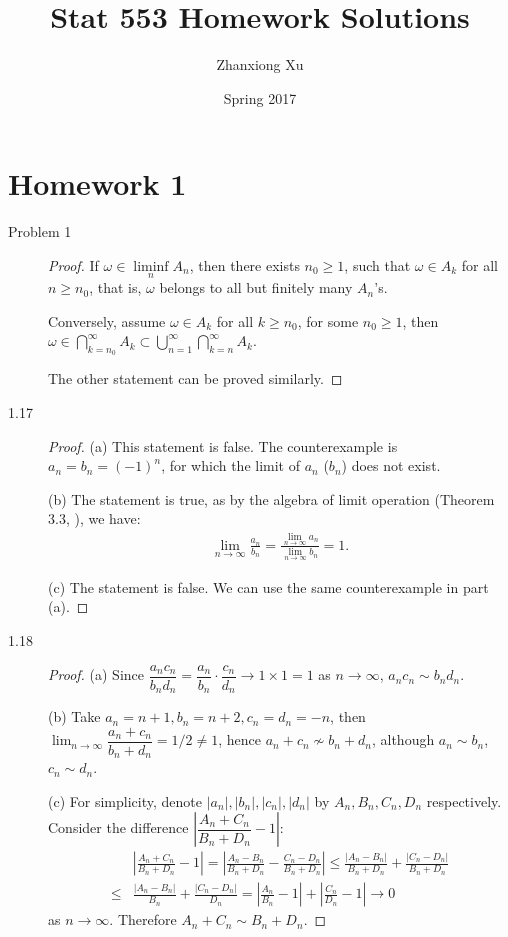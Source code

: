 \documentclass{article}
\title{Stat 553 Homework Solutions}
\author{Zhanxiong Xu}
\date{Spring 2017}
\theoremstyle{definition}
\theoremstyle{plain}
\theoremstyle{remark}
\begin{document}
\maketitle

\section*{Homework 1}
\begin{description}
\item[Problem 1]
\begin{proof} 
If $\omega \in \liminf\limits_n A_n$, then there exists $n_0 \geq 1$, such that
$\omega \in A_k$ for all $n \geq n_0$, that is, $\omega$ belongs to all but finitely many $A_n$'s.

Conversely, assume $\omega \in A_k$ for all $k \geq n_0$, for some $n_0 \geq 1$, then 
$\omega \in \bigcap_{k = n_0}^{\infty}A_k \subset \bigcup_{n = 1}^\infty 
\bigcap_{k = n}^\infty A_k$.

The other statement can be proved similarly.
\end{proof}

\item[1.17]
\begin{proof}
(a) This statement is false. The counterexample is $a_n = b_n = (-1)^n$, for which the 
limit of $a_n$ ($b_n$) does not exist.

(b) The statement is true, as by the algebra of limit operation (Theorem 3.3,
\cite{rudin1964}), we have:
\begin{align*}
    \lim_{n \to \infty} \frac{a_n}{b_n} = \frac{\lim\limits_{n \to \infty}a_n}
    {\lim\limits_{n \to \infty}b_n} = 1.
\end{align*}

(c) The statement is false. We can use the same counterexample in part (a).
\end{proof}

\item[1.18]
\begin{proof}
(a)
Since $\dfrac{a_n c_n}{b_n d_n} = \dfrac{a_n}{b_n} \cdot \dfrac{c_n}{d_n} \to 1 \times 1 
= 1$ as $n \to \infty$, $a_n c_n \sim b_n d_n$. 

(b) Take $a_n = n + 1, b_n = n + 2, c_n = d_n = -n$, then $\lim_{n \to \infty} \dfrac{a_n + c_n}{b_n + d_n} = 1/2 \neq 1$, hence $a_n + c_n \not\sim b_n + d_n$, although $a_n \sim b_n$, $c_n \sim d_n$.

(c) For simplicity, denote $|a_n|, |b_n|, |c_n|, |d_n|$ by $A_n, B_n, C_n, D_n$ 
respectively. Consider the difference $\left|\dfrac{A_n + C_n}{B_n + D_n} - 1\right|$:
\begin{align*}
    & \left|\frac{A_n + C_n}{B_n + D_n} - 1\right| 
  = \left|\frac{A_n - B_n}{B_n + D_n} - \frac{C_n - D_n}{B_n + D_n}\right| 
  \leq \frac{|A_n - B_n|}{B_n + D_n} + \frac{|C_n - D_n|}{B_n + D_n} \\
  \leq & \frac{|A_n - B_n|}{B_n} + \frac{|C_n - D_n|}{D_n} 
  = \left|\frac{A_n}{B_n} - 1\right| + \left|\frac{C_n}{D_n} - 1\right| \to 0
\end{align*}
as $n \to \infty$. Therefore $A_n + C_n \sim B_n + D_n$. 


\end{proof}
\end{description}
\end{document}
